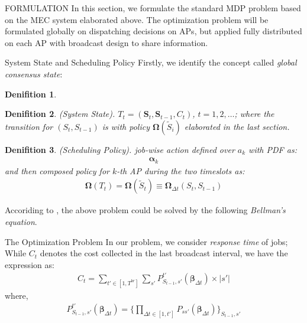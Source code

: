 \documentclass[10pt, conference, letterpaper]{IEEEtran}
\newtheorem{definition}{Denifition}
\renewcommand{\vec}{\mathbf}
\newcommand{\Stat}{\mathbf{S}}
\begin{document}
    \begin{section}{FORMULATION}
        \label{sec:formulation}
        In this section, we formulate the standard MDP problem based on the MEC system elaborated above. The optimization problem will be formulated globally on dispatching decisions on APs, but applied fully distributed on each AP with broadcast design to share information.

        \begin{section}{System State and Scheduling Policy}
            Firstly, we identify the concept called \emph{global consensus state}:
            \begin{definition}
                
            \end{definition}

            \begin{definition}
                (System State).
                $T_t = (\Stat_t, \Stat_{t-1}, C_t)$, $t=1,2,\dots$; where the transition for $(S_{t}, S_{t-1})$ is with policy $\vec{\Omega}(\tilde{S}_i)$ elaborated in the last section.
            \end{definition}

            \begin{definition}
                (Scheduling Policy).
                job-wise action defined over $a_k$ with PDF as:
                \begin{align}
                    \vec\alpha_{k}
                \end{align}
                and then composed policy for $k$-th AP during the two timeslots as:
                \begin{align}
                    \vec{\Omega}(T_t) = \vec{\Omega}(\tilde{S}_t) \equiv \vec{\Omega}_{\Delta{t}}(S_t, S_{t-1})
                \end{align}
            \end{definition}

            Accoriding to \cite{sutton1998introduction}, the above problem could be solved by the following \emph{Bellman's equation}.
        \end{section}

        \begin{subsection}{The Optimization Problem}
            In our problem, we consider \emph{response time} of jobs;
            While $C_t$ denotes the cost collected in the last broadcast interval, we have the expression as:
            \begin{align}
                C_t = \sum_{t'\in[1,T^{br}]} \sum_{s'} P_{S_{t-1},s'}^{t'}(\vec{\beta}_{\Delta{t}}) \times |s'|
            \end{align}
            where,
            \begin{align}
                P_{S_{t-1},s'}^{t'}(\vec{\beta}_{\Delta{t}})
                = \{
                    \prod_{\Delta{t} \in [1,t']} P_{ss'}(\vec{\beta}_{\Delta{t}})
                \}_{S_{t-1}, s'}
            \end{align}
            

\end{subsection}
\end{section}
\end{document}
